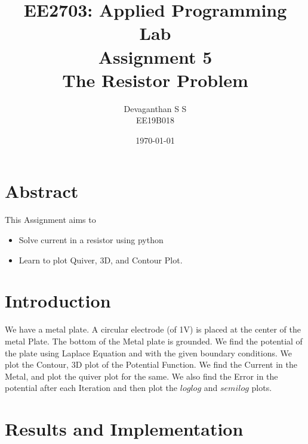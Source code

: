 \documentclass[12pt, a4paper]{report}
\title{\textbf{EE2703: Applied Programming Lab\\Assignment 5\\The Resistor Problem
}}
\author{Devaganthan S S\\ EE19B018}
\date{\today}
\begin{document}
\maketitle


\section{Abstract}
This Assignment aims to 
\begin{itemize}
  \item Solve current in a resistor using python
  \item Learn to plot Quiver, 3D, and Contour Plot.
\end{itemize}


\section{Introduction}
We have a metal plate. A circular electrode (of 1V) is placed at the center of the metal Plate. The bottom of the Metal plate is grounded. We find the potential of the plate using Laplace Equation and with the given boundary conditions. We plot the Contour, 3D plot of the Potential Function. We find the Current in the Metal, and plot the quiver plot for the same. We also find the Error in the potential after each Iteration and then plot the $loglog$ and $semilog$ plots.
\section{Results and Implementation}
\end{document}

